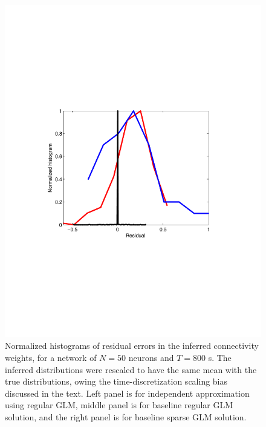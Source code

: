 \begin{figure}
\begin{minipage}[c]{0.30\hsize}
\includegraphics[width=\hsize]{../figs/Figure10c_residuals_basespa}
\end{minipage}
\caption{Normalized histograms of residual errors in the inferred connectivity weights, for
a network of $N=50$ neurons and $T=800$ s. The inferred distributions were rescaled
to have the same mean with the true distributions, owing the time-discretization scaling bias
discussed in the text.
Left panel is for independent approximation using regular GLM, middle panel is
for baseline regular GLM solution, and the right panel is for baseline
sparse GLM solution.}
\label{fig:residuals}
\end{figure}



